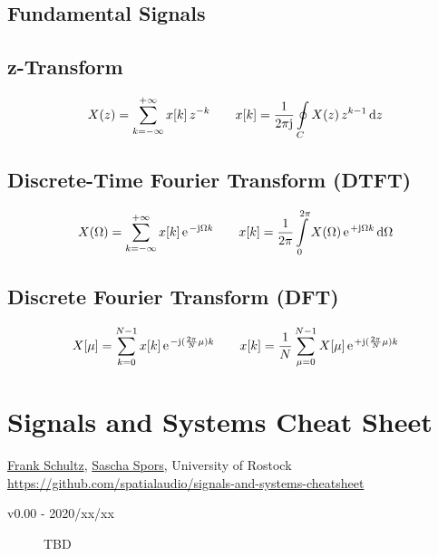 \documentclass[landscape,columns=4]{cheatsheet}
\begin{document}
\subsection{Fundamental Signals}

\subsection{z-Transform}
%
\begin{align*}
X(z) = \sum\limits_{k=-\infty}^{+\infty} x[k] \,z^{-k}
\qquad
x[k] = \frac{1}{2\pi\im}\oint\limits_{C}^{} X(z) \,z^{k-1}\,\mathrm{d}z
\end{align*}

\subsection{Discrete-Time Fourier Transform (DTFT)}
%
\begin{align*}
X(\Omega) = \sum\limits_{k=-\infty}^{+\infty} x[k] \,\e^{-\im \Omega k}
\qquad
x[k] = \frac{1}{2\pi}\int\limits_{0}^{2\pi} X(\Omega) \,\e^{+\im \Omega k}\,\mathrm{d}\Omega
\end{align*}

\subsection{Discrete Fourier Transform (DFT)}
%
\begin{align*}
X[\mu] = \sum\limits_{k=0}^{N-1} x[k] \,\e^{-\im (\frac{2\pi}{N} \mu) k}
\qquad
x[k] = \frac{1}{N}\sum\limits_{\mu=0}^{N-1} X[\mu] \,\e^{+\im (\frac{2\pi}{N} \mu) k}
\end{align*}

\section{Signals and Systems Cheat Sheet}
\href{mailto:frank.schultz@uni-rostock.de}{Frank Schultz},
\href{mailto:sascha.spors@uni-rostock.de}{Sascha Spors},
University of Rostock
\tiny
\url{https://github.com/spatialaudio/signals-and-systems-cheatsheet}
\normalsize
\begin{description}
\item[v0.00 - 2020/xx/xx] TBD
\end{description}
\end{document}
